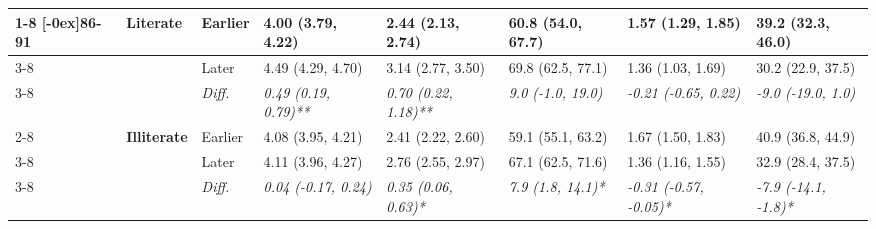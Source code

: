 \documentclass[12pt, a4paper]{article}
\begin{document}
\begin{appendices}
\begin{table}[!p]
{\begin{tabular}[t]{>{}l>{}lllllll}
        \cmidrule{1-8}
        \multirow{9}{*}[-0ex]{\textbf{86-91}} & \multirow{3}{*}{\textbf{Literate}}   & Earlier                       & 4.00 (3.79, 4.22)                           & 2.44 (2.13, 2.74)                           & 60.8 (54.0, 67.7)                           & 1.57 (1.29, 1.85)                              & 39.2 (32.3, 46.0)                              \\
        \cmidrule{3-8}
                                              &                                      & Later                         & 4.49 (4.29, 4.70)                           & 3.14 (2.77, 3.50)                           & 69.8 (62.5, 77.1)                           & 1.36 (1.03, 1.69)                              & 30.2 (22.9, 37.5)                              \\
        \cmidrule{3-8}
                                              &                                      & \cellcolor{gray!10}\em{Diff.} & \cellcolor{gray!10}\em{0.49 (0.19, 0.79)**} & \cellcolor{gray!10}\em{0.70 (0.22, 1.18)**} & \cellcolor{gray!10}\em{9.0 (-1.0, 19.0)}    & \cellcolor{gray!10}\em{-0.21 (-0.65, 0.22)}    & \cellcolor{gray!10}\em{-9.0 (-19.0, 1.0)}      \\
        \cmidrule{2-8}
                                              & \multirow{3}{*}{\textbf{Illiterate}} & Earlier                       & 4.08 (3.95, 4.21)                           & 2.41 (2.22, 2.60)                           & 59.1 (55.1, 63.2)                           & 1.67 (1.50, 1.83)                              & 40.9 (36.8, 44.9)                              \\
        \cmidrule{3-8}
                                              &                                      & Later                         & 4.11 (3.96, 4.27)                           & 2.76 (2.55, 2.97)                           & 67.1 (62.5, 71.6)                           & 1.36 (1.16, 1.55)                              & 32.9 (28.4, 37.5)                              \\
        \cmidrule{3-8}
                                              &                                      & \cellcolor{gray!10}\em{Diff.} & \cellcolor{gray!10}\em{0.04 (-0.17, 0.24)}  & \cellcolor{gray!10}\em{0.35 (0.06, 0.63)*}  & \cellcolor{gray!10}\em{7.9 (1.8, 14.1)*}    & \cellcolor{gray!10}\em{-0.31 (-0.57, -0.05)*}  & \cellcolor{gray!10}\em{-7.9 (-14.1, -1.8)*}    \\
        \bottomrule
      \end{tabular}}
  \end{table}
  \vspace*{\fill}


\end{appendices}
\end{document}
